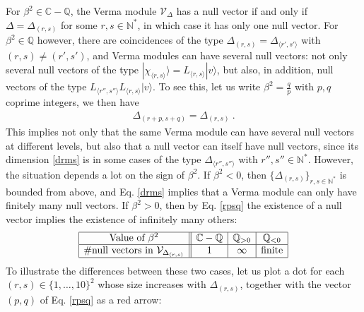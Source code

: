 \documentclass[12pt, a4paper]{article}
\theoremstyle{break}
\begin{document}
For $\beta^2\in\mathbb{C}-\mathbb{Q}$, the Verma module $\mathcal{V}_\Delta$ has a null vector if and only if $\Delta=\Delta_{(r, s)}$ for some $r,s\in\mathbb{N}^*$, in which case it has only one null vector. For $\beta^2\in\mathbb{Q}$ however, there are coincidences of the type $\Delta_{(r, s)}=\Delta_{\langle r',s'\rangle}$ with $(r,s)\neq (r',s')$, and Verma modules can have several null vectors: not only several null vectors of the type $|\chi_{\langle r,s\rangle}\rangle= L_{\langle r,s\rangle} |v\rangle$, but also, in addition, null vectors of the type  $L_{\langle r'',s''\rangle}L_{\langle r,s\rangle} |v\rangle$. To see this, let us write $\beta^2 = \frac{q}{p}$ with $p,q$ coprime integers, we then have 
\begin{align}
 \Delta_{(r+p,s+q)} = \Delta_{(r,s)}\ .
 \label{rpsq}
\end{align}
This implies not only that the same Verma module can have several null vectors at different levels, but also that a null vector can itself have null vectors, since its dimension \eqref{drms} is in some cases of the type $\Delta_{\langle r'',s''\rangle}$ with $r'',s''\in \mathbb{N}^*$. However, the situation depends a lot on the sign of $\beta^2$. If $\beta^2<0$, then $\{\Delta_{(r, s)}\}_{r,s\in\mathbb{N}^*}$ is bounded from above, and Eq. \eqref{drms} implies that a Verma module can only have finitely many null vectors. If $\beta^2>0$, then by Eq. \eqref{rpsq} the existence of a null vector implies the existence of infinitely many others: 
\begin{align}
 \begin{array}{|c||c|c|c|}
  \hline 
  \text{Value of }\beta^2 & \mathbb{C}-\mathbb{Q} & \mathbb{Q}_{>0} & \mathbb{Q}_{<0}
  \\
  \hline 
  \#\text{null vectors in } \mathcal{V}_{\Delta_{(r, s)}} & 1 & \infty & \text{finite} 
  \\
  \hline 
 \end{array}
\end{align}
To illustrate the differences between these two cases, let us plot a dot for each $(r,s)\in \{1,\dots, 10\}^2$ whose size increases with 
$\Delta_{(r,s)}$, together with the vector $(p, q)$ of Eq. \eqref{rpsq} as a red arrow:
\end{document}
